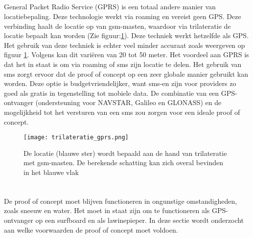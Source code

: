 \subsection{}
General Packet Radio Service (GPRS) is een totaal andere manier van locatiebepaling. Deze technologie werkt via roaming en vereist geen GPS. Deze verbinding haalt de locatie op van gsm-masten, waardoor via trilateratie de locatie bepaalt kan worden (Zie figuur:\ref{fig:trilateratie_gprs}). Deze techniek werkt hetzelfde als GPS.
\newline
Het gebruik van deze techniek is echter veel minder accuraat zoals weergeven op figuur \ref{fig:trilateratie_gprs}. Volgens \cite{gprs} kan dit variëren van 20 tot 50 meter. Het voordeel aan GPRS is dat het in staat is om via roaming of sms zijn locatie te delen. Het gebruik van sms zorgt ervoor dat de proof of concept op een zeer globale manier gebruikt kan worden. Deze optie is budgetvriendelijker, want sms-en zijn voor providers zo goed als gratis in tegenstelling tot mobiele data. De combinatie van een GPS-ontvanger (ondersteuning voor NAVSTAR, Galileo en GLONASS) en de mogelijkheid tot het versturen van een sms zou zorgen voor een ideale proof of concept. 
\begin{figure}
    \texttt{[image: trilateratie\_gprs.png]}
    \caption[Trilateratie bij GPRS]{De locatie (blauwe ster) wordt bepaald aan de hand van trilateratie met gsm-masten. De berekende schatting kan zich overal bevinden in het blauwe vlak}
    \label{fig:trilateratie_gprs}
\end{figure}
\pagebreak
\raggedbottom
\section{}
De proof of concept moet blijven functioneren in ongunstige omstandigheden, zoals sneeuw en water. Het moet in staat zijn om te functioneren als GPS-ontvanger op een surfboard en als lawinepieper. In deze sectie wordt onderzocht aan welke voorwaarden de proof of concept moet voldoen.
